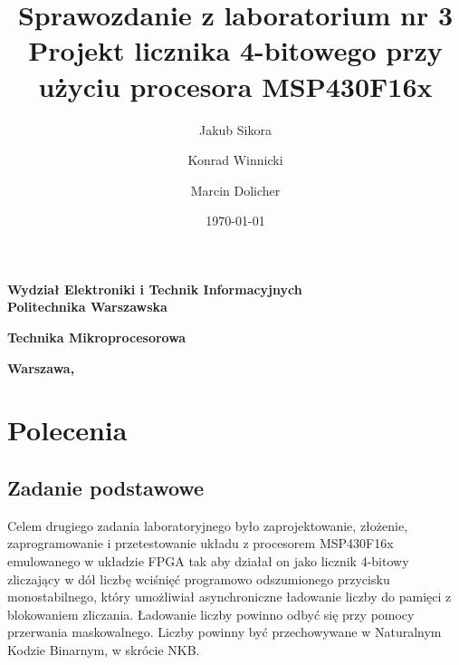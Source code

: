 \documentclass[a4paper,titlepage,11pt,floatssmall]{mwrep}
\title{\bf Sprawozdanie z laboratorium nr 3 \\ Projekt licznika 4-bitowego przy użyciu procesora MSP430F16x \vskip 0.1cm}
\author{Jakub Sikora \and Konrad Winnicki \and Marcin Dolicher}
\date{\today}
\begin{document}
\makeatletter
\renewcommand{\maketitle}{\begin{titlepage}
		\begin{center}{\LARGE {\bf
					Wydział Elektroniki i Technik Informacyjnych}}\\
			\vspace{0.4cm}
			{\LARGE {\bf Politechnika Warszawska}}\\
			\vspace{0.3cm}
		\end{center}
		\vspace{5cm}
		\begin{center}
			{\bf \LARGE Technika Mikroprocesorowa \vskip 0.1cm}
		\end{center}
		\vspace{1cm}
		\begin{center}
			{\bf \LARGE \@title}
		\end{center}
		\vspace{2cm}
		\begin{center}
			{\bf \Large \@author \par}
		\end{center}
		\vspace*{\stretch{6}}
		\begin{center}
			\bf{\large{Warszawa, \@date\vskip 0.1cm}}
		\end{center}
	\end{titlepage}
	}
\makeatother
\maketitle

\tableofcontents


\chapter{Polecenia}

\section{Zadanie podstawowe}
\indent{} Celem drugiego zadania laboratoryjnego było zaprojektowanie, złożenie, zaprogramowanie i przetestowanie układu z procesorem MSP430F16x emulowanego w układzie FPGA tak aby działał on jako licznik 4-bitowy zliczający w dół liczbę wciśnięć programowo odszumionego przycisku monostabilnego, który umożliwiał asynchroniczne ładowanie liczby do pamięci z blokowaniem zliczania. Ładowanie liczby powinno odbyć się przy pomocy przerwania maskowalnego. Liczby powinny być przechowywane w Naturalnym Kodzie Binarnym, w skrócie NKB.
\end{document}
